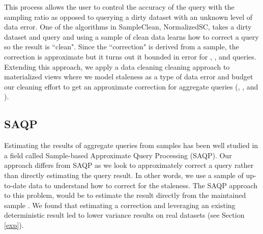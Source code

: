 This process allows the user to control the accuracy of the query with the sampling ratio as opposed to querying a dirty dataset with an unknown level of data error.
One of the algorithms in SampleClean, NormalizedSC, takes a dirty dataset and query and using a sample of clean data learns how
to correct a query so the result is ``clean".
Since the ``correction" is derived from a sample, the correction is approximate but it turns out it bounded in error for  \sumfunc, \countfunc, and \avgfunc queries.
Extending this approach, we apply a data cleaning cleaning approach to materialized views where we model staleness as a type of data error and budget our cleaning effort to get an approximate correction for aggregate queries (\sumfunc, \countfunc, and \avgfunc).

\subsection{SAQP}
Estimating the results of aggregate queries from samples has been
well studied in a field called Sample-based Approximate Query Processing
(SAQP). 
Our approach differs from SAQP as we look to
approximately correct a query rather than directly estimating the query result.
In other words, we use a sample of up-to-date data to understand how to correct for the
staleness. 
The SAQP approach to this problem, would be to
estimate the result directly from the maintained sample \cite{joshi2008materialized}.
We found that estimating
a correction and leveraging an existing deterministic result led
to lower variance results on real datasets (see Section \ref{exp}). 


